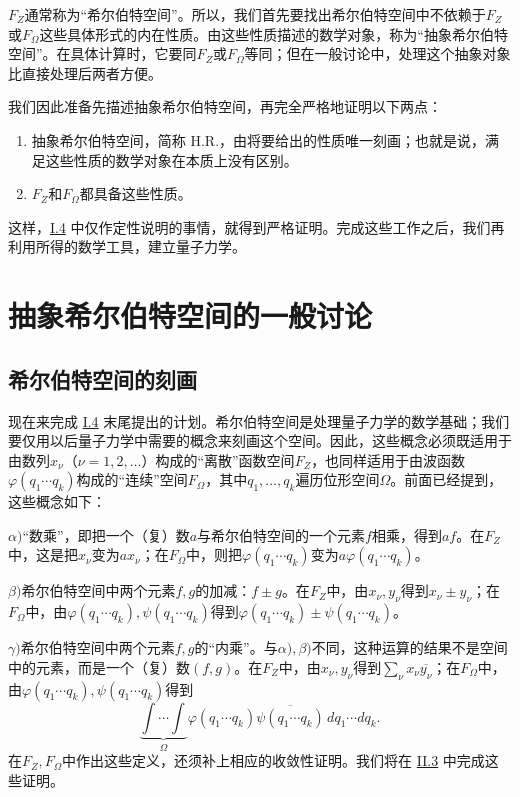 \documentclass[fontsize=13pt,twoside,openany,headings=normal,parskip=false,bookmarkpackage=false,DIV=calc]{scrbook}
\begin{document}
$F_Z$通常称为“希尔伯特空间”。所以，我们首先要找出希尔伯特空间中不依赖于$F_Z$或$F_\Omega$这些具体形式的内在性质。由这些性质描述的数学对象，称为“抽象希尔伯特空间”。在具体计算时，它要同$F_Z$或$F_\Omega$等同；但在一般讨论中，处理这个抽象对象比直接处理后两者方便。

我们因此准备先描述抽象希尔伯特空间，再完全严格地证明以下两点：
\begin{enumerate}
 \item 抽象希尔伯特空间，简称 H.R.，由将要给出的性质唯一刻画；也就是说，满足这些性质的数学对象在本质上没有区别。
 \item $F_Z$和$F_\Omega$都具备这些性质。
\end{enumerate}
这样，\hyperref[sec:I.4]{I.4} 中仅作定性说明的事情，就得到严格证明。完成这些工作之后，我们再利用所得的数学工具，建立量子力学。


\chapter{抽象希尔伯特空间的一般讨论}\label{chap:II}
\section{希尔伯特空间的刻画}\label{sec:II.1}

现在来完成 \hyperref[sec:I.4]{I.4} 末尾提出的计划。希尔伯特空间是处理量子力学的数学基础；我们要仅用以后量子力学中需要的概念来刻画这个空间。因此，这些概念必须既适用于由数列$x_\nu$（$\nu=1,\allowbreak 2,\allowbreak \ldots$）构成的“离散”函数空间$F_Z$，也同样适用于由波函数$\varphi(q_1\cdots q_k)$构成的“连续”空间$F_\Omega$，其中$q_1,\allowbreak \ldots,\allowbreak q_k$遍历位形空间$\Omega$。前面已经提到，这些概念如下：

\hypertarget{origpage-19}{}\label{origpage-19}$\alpha)$“数乘”，即把一个（复）数$a$与希尔伯特空间的一个元素$f$相乘，得到$af$。在$F_Z$中，这是把$x_\nu$变为$ax_\nu$；在$F_\Omega$中，则把$\varphi(q_1\cdots q_k)$变为$a\varphi(q_1\cdots q_k)$。

$\beta)$希尔伯特空间中两个元素$f,\allowbreak g$的加减：$f\pm g$。在$F_Z$中，由$x_\nu,\allowbreak y_\nu$得到$x_\nu\pm y_\nu$；在$F_\Omega$中，由$\varphi(q_1\cdots q_k),\allowbreak \psi(q_1\cdots q_k)$得到$\varphi(q_1\cdots q_k)\pm\psi(q_1\cdots q_k)$。

$\gamma)$希尔伯特空间中两个元素$f,\allowbreak g$的“内乘”。与$\alpha),\allowbreak \beta)$不同，这种运算的结果不是空间中的元素，而是一个（复）数$(f,\allowbreak g)$。在$F_Z$中，由$x_\nu,\allowbreak y_\nu$得到$\sum_\nu x_\nu\overline{y_\nu}$；在$F_\Omega$中，由$\varphi(q_1\cdots q_k),\allowbreak \psi(q_1\cdots q_k)$得到
\[
\underbrace{\int\!\cdots\!\int}_{\Omega}
\varphi(q_1\cdots q_k)\overline{\psi(q_1\cdots q_k)}\,dq_1\cdots dq_k.
\]
在$F_Z,\allowbreak F_\Omega$中作出这些定义，还须补上相应的收敛性证明。我们将在 \hyperref[sec:II.3]{II.3} 中完成这些证明。
\end{document}

